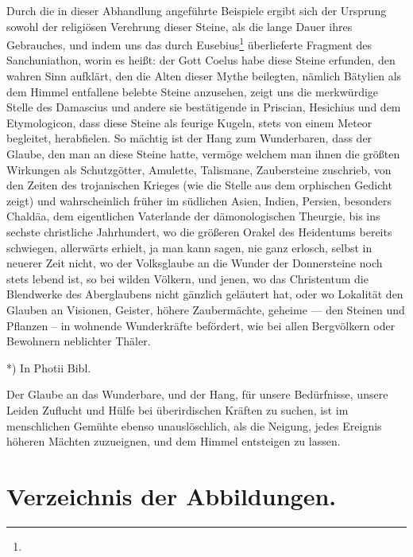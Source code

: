 \documentclass[a4paper, 11pt, oneside, polutonikogreek, german]{article}
\begin{document}
Durch die in dieser Abhandlung angeführte Beispiele ergibt sich der Ursprung sowohl der religiösen Verehrung dieser Steine, als die lange Dauer ihres Gebrauches, und indem uns das durch Eusebius\footnote{} überlieferte Fragment des Sanchuniathon, worin es heißt: der Gott Coelus habe diese Steine erfunden, den wahren Sinn aufklärt, den die Alten dieser Mythe beilegten, nämlich Bätylien als dem Himmel entfallene belebte Steine anzusehen, zeigt uns die merkwürdige Stelle des Damascius und andere sie bestätigende in Priscian, Hesichius und dem Etymologicon, dass diese Steine als feurige Kugeln, stets von einem Meteor begleitet, herabfielen. So mächtig ist der Hang zum Wunderbaren, dass der Glaube, den man an diese Steine hatte, vermöge welchem man ihnen die größten Wirkungen als Schutzgötter, Amulette, Talismane, Zaubersteine zuschrieb, von den Zeiten des trojanischen Krieges (wie die Stelle aus dem orphischen Gedicht zeigt) und wahrscheinlich früher im südlichen Asien, Indien, Persien, besonders Chaldäa, dem eigentlichen Vaterlande der dämonologischen Theurgie, bis ins sechste christliche Jahrhundert, wo die größeren Orakel des Heidentums bereits schwiegen, allerwärts erhielt, ja man kann sagen, nie ganz erlosch, selbst in neuerer Zeit nicht, wo der Volksglaube an die Wunder der Donnersteine noch stets lebend ist, so bei wilden Völkern, und jenen, wo das Christentum die Blendwerke des Aberglaubens nicht gänzlich geläutert hat, oder wo Lokalität den Glauben an Visionen, Geister, höhere Zaubermächte, geheime --- den Steinen und Pflanzen -- in wohnende Wunderkräfte befördert, wie bei allen Bergvölkern oder Bewohnern neblichter Thäler.

*) In Photii Bibl.

Der Glaube an das Wunderbare, und der Hang, für unsere Bedürfnisse, unsere Leiden Zuflucht und Hülfe bei überirdischen Kräften zu suchen, ist im menschlichen Gemühte ebenso unauslöschlich, als die Neigung, jedes Ereignis höheren Mächten zuzueignen, und dem Himmel entsteigen zu lassen.
\clearpage
\section*{Verzeichnis der Abbildungen.}
\end{document}
